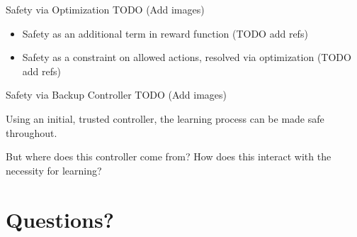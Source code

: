 \documentclass{beamer}
\begin{document}
\begin{frame}{Safety via Optimization}
  TODO (Add images)
  \begin{itemize}
    \item Safety as an additional term in reward function (TODO add refs)
    \item Safety as a constraint on allowed actions, resolved via optimization (TODO add refs)
  \end{itemize}
\end{frame}

\begin{frame}{Safety via Backup Controller}
  TODO (Add images)

  Using an initial, trusted controller, the learning process can be made safe throughout.

  But where does this controller come from? How does this interact with the necessity for learning?
\end{frame}

\section{Questions?}
\end{document}
